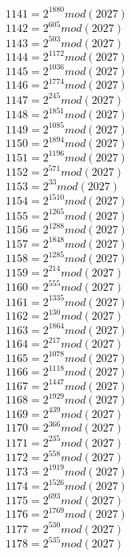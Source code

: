 \documentclass[12pt, letterpaper]{article}
\begin{document}
\begin{itemize}
\begin{multicols}{3}
$1141= 2^{1880} mod (2027)$\\
$1142= 2^{605} mod (2027)$\\
$1143= 2^{503} mod (2027)$\\
$1144= 2^{1172} mod (2027)$\\
$1145= 2^{1036} mod (2027)$\\
$1146= 2^{1774} mod (2027)$\\
$1147= 2^{245} mod (2027)$\\
$1148= 2^{1851} mod (2027)$\\
$1149= 2^{1085} mod (2027)$\\
$1150= 2^{1894} mod (2027)$\\
$1151= 2^{1196} mod (2027)$\\
$1152= 2^{571} mod (2027)$\\
$1153= 2^{33} mod (2027)$\\
$1154= 2^{1510} mod (2027)$\\
$1155= 2^{1265} mod (2027)$\\
$1156= 2^{1288} mod (2027)$\\
$1157= 2^{1848} mod (2027)$\\
$1158= 2^{1285} mod (2027)$\\
$1159= 2^{214} mod (2027)$\\
$1160= 2^{555} mod (2027)$\\
$1161= 2^{1335} mod (2027)$\\
$1162= 2^{130} mod (2027)$\\
$1163= 2^{1864} mod (2027)$\\
$1164= 2^{217} mod (2027)$\\
$1165= 2^{1078} mod (2027)$\\
$1166= 2^{1118} mod (2027)$\\
$1167= 2^{1447} mod (2027)$\\
$1168= 2^{1929} mod (2027)$\\
$1169= 2^{439} mod (2027)$\\
$1170= 2^{366} mod (2027)$\\
$1171= 2^{235} mod (2027)$\\
$1172= 2^{558} mod (2027)$\\
$1173= 2^{1919} mod (2027)$\\
$1174= 2^{1526} mod (2027)$\\
$1175= 2^{693} mod (2027)$\\
$1176= 2^{1769} mod (2027)$\\
$1177= 2^{530} mod (2027)$\\
$1178= 2^{535} mod (2027)$\\

\end{multicols}
\end{itemize}
\end{document}
